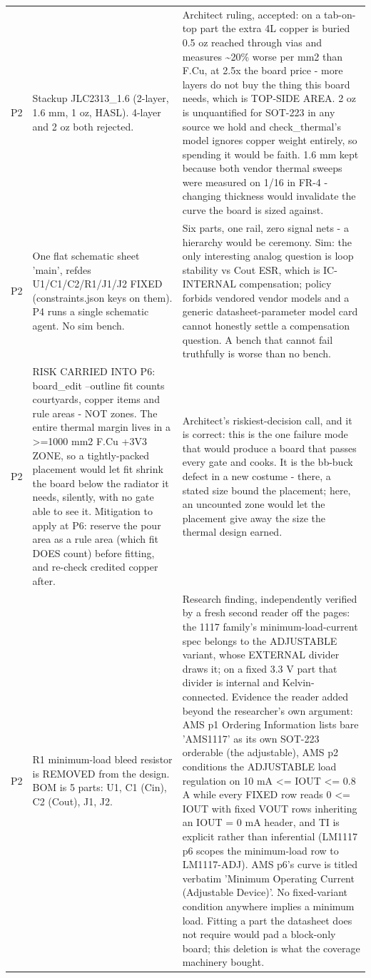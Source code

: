 \documentclass[11pt,a4paper]{article}
\begin{document}
{\begin{longtable}{lp{5.2cm}p{7.2cm}}
P2 & Stackup JLC2313\_1.6 (2-layer, 1.6 mm, 1 oz, HASL). 4-layer and 2 oz both rejected. & Architect ruling, accepted: on a tab-on-top part the extra 4L copper is buried 0.5 oz reached through vias and measures \textasciitilde{}20\% worse per mm2 than F.Cu, at 2.5x the board price - more layers do not buy the thing this board needs, which is TOP-SIDE AREA. 2 oz is unquantified for SOT-223 in any source we hold and check\_thermal's model ignores copper weight entirely, so spending it would be faith. 1.6 mm kept because both vendor thermal sweeps were measured on 1/16 in FR-4 - changing thickness would invalidate the curve the board is sized against. \\
P2 & One flat schematic sheet 'main', refdes U1/C1/C2/R1/J1/J2 FIXED (constraints.json keys on them). P4 runs a single schematic agent. No sim bench. & Six parts, one rail, zero signal nets - a hierarchy would be ceremony. Sim: the only interesting analog question is loop stability vs Cout ESR, which is IC-INTERNAL compensation; policy forbids vendored vendor models and a generic datasheet-parameter model card cannot honestly settle a compensation question. A bench that cannot fail truthfully is worse than no bench. \\
P2 & RISK CARRIED INTO P6: board\_edit --outline fit counts courtyards, copper items and rule areas - NOT zones. The entire thermal margin lives in a \textgreater{}=1000 mm2 F.Cu +3V3 ZONE, so a tightly-packed placement would let fit shrink the board below the radiator it needs, silently, with no gate able to see it. Mitigation to apply at P6: reserve the pour area as a rule area (which fit DOES count) before fitting, and re-check credited copper after. & Architect's riskiest-decision call, and it is correct: this is the one failure mode that would produce a board that passes every gate and cooks. It is the bb-buck defect in a new costume - there, a stated size bound the placement; here, an uncounted zone would let the placement give away the size the thermal design earned. \\
P2 & R1 minimum-load bleed resistor is REMOVED from the design. BOM is 5 parts: U1, C1 (Cin), C2 (Cout), J1, J2. & Research finding, independently verified by a fresh second reader off the pages: the 1117 family's minimum-load-current spec belongs to the ADJUSTABLE variant, whose EXTERNAL divider draws it; on a fixed 3.3 V part that divider is internal and Kelvin-connected. Evidence the reader added beyond the researcher's own argument: AMS p1 Ordering Information lists bare 'AMS1117' as its own SOT-223 orderable (the adjustable), AMS p2 conditions the ADJUSTABLE load regulation on 10 mA \textless{}= IOUT \textless{}= 0.8 A while every FIXED row reads 0 \textless{}= IOUT with fixed VOUT rows inheriting an IOUT = 0 mA header, and TI is explicit rather than inferential (LM1117 p6 scopes the minimum-load row to LM1117-ADJ). AMS p6's curve is titled verbatim 'Minimum Operating Current (Adjustable Device)'. No fixed-variant condition anywhere implies a minimum load. Fitting a part the datasheet does not require would pad a block-only board; this deletion is what the coverage machinery bought. \\

\end{longtable}}
\end{document}
